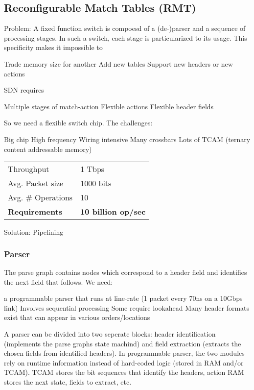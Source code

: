 \documentclass[a4paper, fontsize=8pt, landscape, DIV=1]{scrartcl}
\begin{document}
\begin{multicols*}{4}
  \subsection{Reconfigurable Match Tables (RMT)}
  Problem: A fixed function switch is compoesd of a (de-)parser and a sequence of
  processing stages. In such a switch, each stage is particularized to its usage. 
  This specificity makes it impossible to 
  \begin{outline}
   \1 Trade memory size for another
   \1 Add new tables
   \1 Support new headers or new actions
  \end{outline}

  SDN requires
  \begin{outline}
   \1 Multiple stages of match-action
   \1 Flexible actions
   \1 Flexible header fields
  \end{outline}

  So we need a flexible switch chip. The challenges:
  \begin{outline}
   \1 Big chip
   \1 High frequency
   \1 Wiring intensive
   \1 Many crossbars
   \1 Lots of TCAM (ternary content addressable memory)
  \end{outline}

  \begin{tabularx}{\columnwidth}{X l}
    Throughput & 1 Tbps \\
    Avg. Packet size & 1000 bits \\
    Avg. \# Operations & 10\\
    \textbf{Requirements} & \textbf{10 billion op/sec}
  \end{tabularx}

  Solution: Pipelining

  \subsubsection{Parser}
  The parse graph contains nodes which correspond to a header field and identifies the 
  next field that follows. We need:
  \begin{outline}
   \1 a programmable parser that runs at line-rate (1 packet every 70ns on a 10Gbps link)
   \1 Involves sequential processing
   \1 Some require lookahead
   \1 Many header formats exist that can appear in various orders/locations
  \end{outline}

  A parser can be divided into two seperate blocks: header identification (implements
  the parse graphs state machind) and field extraction (extracts the chosen fields from
  identified headers). In programmable parser, the two modules rely on runtime information instead
  of hard-coded logic (stored in RAM and/or TCAM). TCAM stores the bit sequences that identify
  the headers, action RAM stores the next state, fields to extract, etc. 


\end{multicols*}
\end{document}
